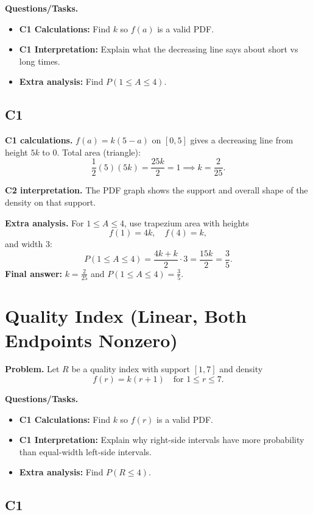 	\textbf{Questions/Tasks.}
	\begin{itemize}
		\item \textbf{C1 Calculations:} Find $k$ so $f(a)$ is a valid PDF.
		\item \textbf{C1 Interpretation:} Explain what the decreasing line says about short vs long times.
		\item \textbf{Extra analysis:} Find $P(1\le A\le 4)$.
	\end{itemize}

	\subsection*{C1}

\textbf{C1 calculations.}
$f(a)=k(5-a)$ on $[0,5]$ gives a decreasing line from height $5k$ to $0$.
	Total area (triangle):
	\[
	\frac12(5)(5k)=\frac{25k}{2}=1\implies k=\frac{2}{25}.
	\]

\textbf{C2 interpretation.}
The PDF graph shows the support and overall shape of the density on that support.

\textbf{Extra analysis.}
For $1\le A\le4$, use trapezium area with heights
\[
f(1)=4k,\quad f(4)=k,
\]
and width $3$:
\[
P(1\le A\le4)=\frac{4k+k}{2}\cdot3=\frac{15k}{2}=\frac35.
\]
\textbf{Final answer:} $k=\frac{2}{25}$ and $P(1\le A\le4)=\frac35$.
	\section{Quality Index (Linear, Both Endpoints Nonzero)}
	
	\textbf{Problem.}
	Let $R$ be a quality index with support $[1,7]$ and density
	\[
	f(r)=k(r+1)\quad\text{for }1\le r\le 7.
	\]
	
	\textbf{Questions/Tasks.}
	\begin{itemize}
		\item \textbf{C1 Calculations:} Find $k$ so $f(r)$ is a valid PDF.
		\item \textbf{C1 Interpretation:} Explain why right-side intervals have more probability than equal-width left-side intervals.
		\item \textbf{Extra analysis:} Find $P(R\le 4)$.
	\end{itemize}

	\subsection*{C1}

